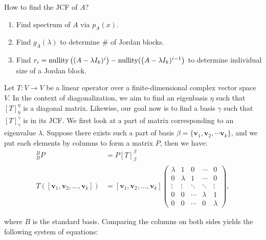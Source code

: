 \begin{gbox}
\begin{remark}
How to find the JCF of $A ?$
\begin{enumerate}
    \item Find spectrum of $A$ via $p_A(x).$
    \item Find $g_A(\lambda)$ to determine \# of Jordan blocks.
    \item Find $r_i=\operatorname{nullity}\left((A -\lambda I_k)^i\right) - \operatorname{nullity}(\left(A -\lambda I_k)^{i-1}\right)$ to determine individual size of a Jordan block.
\end{enumerate}
\end{remark}
\end{gbox}




Let $T:V\to V$ be a linear operator over a finite-dimensional complex vector space $V$.
In the context of diagonalization, we aim to find an eigenbasis $\eta$ such that $[T]^\eta_\eta$ is a diagonal matrix.
Likewise, our goal now is to find a basis $\gamma$ such that $[T]^\gamma_\gamma$ is in its JCF.
We first look at a part of matrix corresponding to an eigenvalue $\lambda$. Suppose there exists such a part of basis $\beta=\{\mathbf{v}_1, \mathbf{v}_2,\cdots\mathbf{v}_k\}$, and we put each elements by columns to form a matrix $P$, then we have:
\begin{align*}
[T]^B_B P &= P [T]^\beta_\beta \\
T([\mathbf{v}_1, \mathbf{v}_2, \dots, \mathbf{v}_k]) &= [\mathbf{v}_1, \mathbf{v}_2, \dots, \mathbf{v}_k] 
\begin{pmatrix} 
\lambda & 1 & 0 & \cdots & 0 \\ 
0 & \lambda & 1 & \cdots & 0 \\ 
\vdots & \vdots & \ddots & \ddots & \vdots \\ 
0 & 0 & \cdots & \lambda & 1 \\ 
0 & 0 & \cdots & 0 & \lambda 
\end{pmatrix},
\end{align*}

where $B$ is the standard basis. Comparing the columns on both sides yields the following system of equations:

